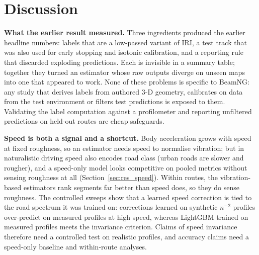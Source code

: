 \section{Discussion}
\label{sec:discussion}
\textbf{What the earlier result measured.}
Three ingredients produced the earlier headline numbers: labels that are a low-passed variant of IRI, a test track that was also used for early stopping and isotonic calibration, and a reporting rule that discarded exploding predictions.
Each is invisible in a summary table; together they turned an estimator whose raw outputs diverge on unseen maps into one that appeared to work.
None of these problems is specific to BeamNG: any study that derives labels from authored 3-D geometry, calibrates on data from the test environment or filters test predictions is exposed to them.
Validating the label computation against a profilometer and reporting unfiltered predictions on held-out routes are cheap safeguards.

\textbf{Speed is both a signal and a shortcut.}
Body acceleration grows with speed at fixed roughness, so an estimator needs speed to normalise vibration; but in naturalistic driving speed also encodes road class (urban roads are slower and rougher), and a speed-only model looks competitive on pooled metrics without sensing roughness at all (Section~\ref{sec:res_speed}).
Within routes, the vibration-based estimators rank segments far better than speed does, so they do sense roughness.
The controlled sweeps show that a learned speed correction is tied to the road spectrum it was trained on: corrections learned on synthetic $n^{-2}$ profiles over-predict on measured profiles at high speed, whereas LightGBM trained on measured profiles meets the invariance criterion.
Claims of speed invariance therefore need a controlled test on realistic profiles, and accuracy claims need a speed-only baseline and within-route analyses.

